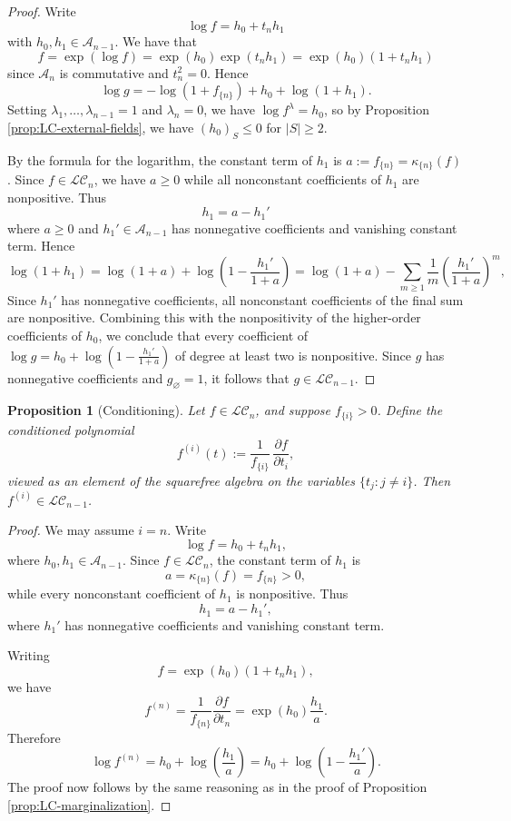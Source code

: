 \documentclass[11pt]{amsart}
\newtheorem{prop}[thm]{Proposition}
\theoremstyle{definition}
\begin{document}
\begin{proof}
    Write
\[
  \log f = h_0+t_n h_1
\]
with \(h_0,h_1\in \mathcal A_{n-1}\). We have that
\[
    f = \exp(\log f) = \exp(h_0)\exp(t_nh_1) = \exp(h_0)(1 + t_n h_1)
\]
since $\mathcal A_n$ is commutative and $t_n^2=0$. Hence
\[
    \log g = - \log(1+f_{\{n\}}) + h_0 + \log(1 + h_1).
\]
Setting $\lambda_1,\dotsc,\lambda_{n-1}=1$ and $\lambda_n=0$, we have $\log f^\lambda = h_0$, so by Proposition \ref{prop:LC-external-fields}, we have $(h_0)_S\le 0$ for $|S| \ge 2$.

By the formula for the logarithm, the constant term of \(h_1\) is \(a := f_{\{n\}} = \kappa_{\{n\}}(f)\). Since \(f\in\mathcal{LC}_n\), we have $a\ge 0$ while all nonconstant coefficients of \(h_1\) are nonpositive. Thus
\[
  h_1 = a - h_1'
\]
where \(a\ge0\) and \(h_1'\in\mathcal A_{n-1}\) has nonnegative coefficients and vanishing constant term. Hence
\[
  \log(1+h_1)
  =
  \log(1+a) + \log\left(1-\frac{h_1'}{1+a}\right)
  =
  \log(1+a) - \sum_{m\ge1}\frac{1}{m}\left(\frac{h_1'}{1+a}\right)^m,
\]
Since \(h_1'\) has nonnegative coefficients, all nonconstant coefficients of the final sum are nonpositive.
Combining this with the nonpositivity of the higher-order
coefficients of \(h_0\), we conclude that every coefficient of
\(\log g = h_0 + \log\left(1 - \frac{h_1'}{1+a}\right)\) of degree at least two is nonpositive.  Since \(g\)
has nonnegative coefficients and \(g_\varnothing=1\), it follows
that \(g\in\mathcal{LC}_{n-1}\).
\end{proof}


\begin{prop}[Conditioning]
\label{prop:LC-conditioning}
Let \(f\in\mathcal{LC}_n\), and suppose \(f_{\{i\}}>0\).
Define the conditioned polynomial
\[
  f^{(i)}(t)
  :=
  \frac{1}{f_{\{i\}}}\,\frac{\partial f}{\partial t_i},
\]
viewed as an element of the squarefree algebra on the variables \(\{t_j:j\neq i\}\).  Then \(f^{(i)}\in\mathcal{LC}_{n-1}\).
\end{prop}

\begin{proof}
We may assume \(i=n\).  Write
\[
  \log f = h_0+t_n h_1,
\]
where \(h_0,h_1\in\mathcal A_{n-1}\).
Since \(f\in\mathcal{LC}_n\), the constant term of \(h_1\) is
\[
  a=\kappa_{\{n\}}(f)=f_{\{n\}}>0,
\]
while every nonconstant coefficient of \(h_1\) is nonpositive.
Thus
\[
  h_1=a - h_1',
\]
where \(h_1'\) has nonnegative coefficients and vanishing constant term.

Writing
\[
  f=\exp(h_0)(1+t_n h_1),
\]
we have
\[
  f^{(n)} =\frac{1}{f_{\{n\}}}\frac{\partial f}{\partial t_n}
  =
  \exp(h_0)\frac{h_1}{a}.
\]
Therefore
\[
  \log f^{(n)}
  =
  h_0+\log\left(\frac{h_1}{a}\right)
  =
  h_0+\log\left(1-\frac{h_1'}{a}\right).
\]
The proof now follows by the same reasoning as in the proof of Proposition \ref{prop:LC-marginalization}.
\end{proof}
\end{document}
